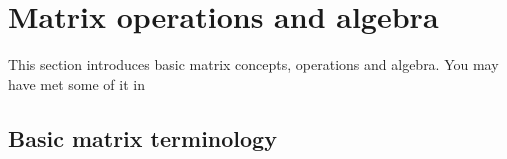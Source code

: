 
\section{Matrix operations and algebra}
\label{sec:moaa}
\secttoc

This section introduces basic matrix concepts, operations and algebra.
You may have met some of it in 


\subsection{Basic matrix terminology}
\label{sec:bmt}

